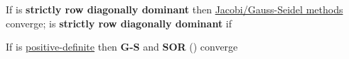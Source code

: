 \hSep %

If  is \textbf{strictly row diagonally dominant} then \underline{Jacobi/Gauss-Seidel methods} converge;
 is \textbf{strictly row diagonally dominant} if 

If  is \underline{positive-definite} then \textbf{G-S} and \textbf{SOR} () converge
